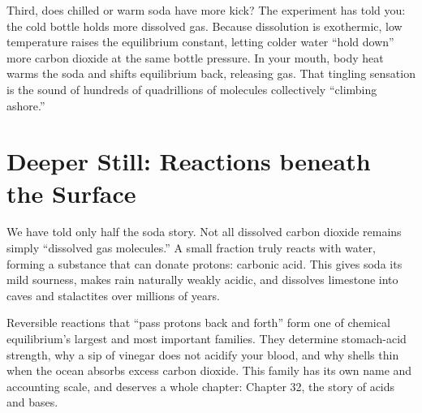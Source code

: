 Third, does chilled or warm soda have more kick? The experiment has told you: the cold bottle holds more dissolved gas. Because dissolution is exothermic, low temperature raises the equilibrium constant, letting colder water ``hold down'' more carbon dioxide at the same bottle pressure. In your mouth, body heat warms the soda and shifts equilibrium back, releasing gas. That tingling sensation is the sound of hundreds of quadrillions of molecules collectively ``climbing ashore.''

\section{Deeper Still: Reactions beneath the Surface}

We have told only half the soda story. Not all dissolved carbon dioxide remains simply ``dissolved gas molecules.'' A small fraction truly reacts with water, forming a substance that can donate protons: carbonic acid. This gives soda its mild sourness, makes rain naturally weakly acidic, and dissolves limestone into caves and stalactites over millions of years.

Reversible reactions that ``pass protons back and forth'' form one of chemical equilibrium's largest and most important families. They determine stomach-acid strength, why a sip of vinegar does not acidify your blood, and why shells thin when the ocean absorbs excess carbon dioxide. This family has its own name and accounting scale, and deserves a whole chapter: Chapter 32, the story of acids and bases.

